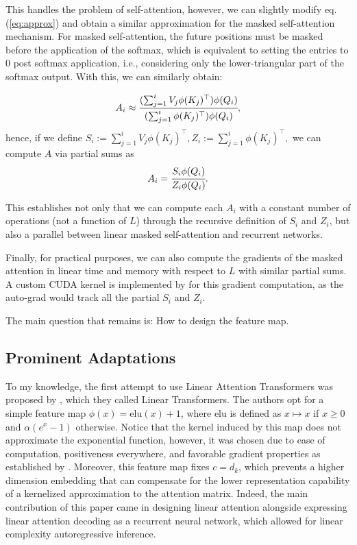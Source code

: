 \vspace{0.5em}
This handles the problem of self-attention, however, we can slightly modify eq. (\ref{eq:approx}) and obtain a similar approximation for the masked self-attention mechanism. For masked self-attention, the future positions must be masked before the application of the softmax, which is equivalent to setting the entries to $0$ post softmax application, i.e., considering only the lower-triangular part of the softmax output. With this, we can similarly obtain:

\begin{equation}
    A_i \approx \cfrac{ (\sum_{j=1}^i V_j\phi(K_j)^\top)\phi(Q_i)}{(\sum_{j=1}^i \phi(K_j)^\top)\phi(Q_i)}, 
\end{equation}
hence, if we define $S_i := \sum_{j=1}^i V_j\phi(K_j)^\top , Z_i := \sum_{j=1}^i \phi(K_j)^\top,$ we can compute $A$ via partial sums as
\begin{equation}
\label{eq:masked-linear}
    A_i = \cfrac{S_i\phi(Q_i)}{Z_i \phi(Q_i)}.
\end{equation}

This establishes not only that we can compute each $A_i$ with a constant number of operations (not a function of $L$) through the recursive definition of $S_i$ and $Z_i$, but also a parallel between linear masked self-attention and recurrent networks.

\vspace{0.5em}

Finally, for practical purposes, we can also compute the gradients of the masked attention in linear time and memory with respect to $L$ with similar partial sums. A custom CUDA kernel is implemented by \cite{katharopoulos2020transformers} for this gradient computation, as the auto-grad would track all the partial $S_i$ and $Z_i$.

\vspace{1em}
The main question that remains is: How to design the feature map.

\subsection{Prominent Adaptations}

To my knowledge, the first attempt to use Linear Attention Transformers was proposed by \cite{katharopoulos2020transformers}, which they called Linear Transformers. The authors opt for a simple feature map $\phi(x) = \text{elu}(x) + 1$, where $\text{elu}$ \cite{clevert2016elu} is defined as $x \mapsto x$ if $x \geq 0$ and $\alpha (e^x - 1)$ otherwise. Notice that the kernel induced by this map does not approximate the exponential function, however, it was chosen due to ease of computation, positiveness everywhere, and favorable gradient properties as established by \cite{clevert2016elu}. Moreover, this feature map fixes $c = d_k$, which prevents a higher dimension embedding that can compensate for the lower representation capability of a kernelized approximation to the attention matrix. Indeed, the main contribution of this paper came in designing linear attention alongside expressing linear attention decoding as a recurrent neural network, which allowed for linear complexity autoregressive inference.

